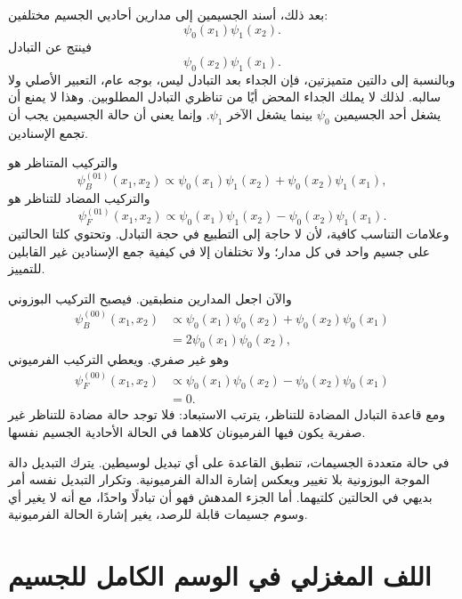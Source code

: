 بعد ذلك، أسند الجسيمين إلى مدارين أحاديي الجسيم مختلفين:
\begin{equation}
\psi_0(x_1)\psi_1(x_2).
\end{equation}
فينتج عن التبادل
\begin{equation}
\psi_0(x_2)\psi_1(x_1).
\end{equation}
وبالنسبة إلى دالتين متميزتين، فإن الجداء بعد التبادل ليس، بوجه عام، التعبير الأصلي ولا سالبه. لذلك لا يملك الجداء المحض أيًا من تناظري التبادل المطلوبين. وهذا لا يمنع أن يشغل أحد الجسيمين \(\psi_0\) بينما يشغل الآخر \(\psi_1\). وإنما يعني أن حالة الجسيمين يجب أن تجمع الإسنادين.

والتركيب المتناظر هو
\begin{equation}
\psi_B^{(01)}(x_1,x_2)
\propto
\psi_0(x_1)\psi_1(x_2)
+
\psi_0(x_2)\psi_1(x_1),
\end{equation}
والتركيب المضاد للتناظر هو
\begin{equation}
\psi_F^{(01)}(x_1,x_2)
\propto
\psi_0(x_1)\psi_1(x_2)
-
\psi_0(x_2)\psi_1(x_1).
\end{equation}
وعلامات التناسب كافية، لأن لا حاجة إلى التطبيع في حجة التبادل. وتحتوي كلتا الحالتين على جسيم واحد في كل مدار؛ ولا تختلفان إلا في كيفية جمع الإسنادين غير القابلين للتمييز.

والآن اجعل المدارين منطبقين. فيصبح التركيب البوزوني
\begin{align}
\psi_B^{(00)}(x_1,x_2)
&\propto
\psi_0(x_1)\psi_0(x_2)
+
\psi_0(x_2)\psi_0(x_1)\\
&=
2\psi_0(x_1)\psi_0(x_2),
\end{align}
وهو غير صفري. ويعطي التركيب الفرميوني
\begin{align}
\psi_F^{(00)}(x_1,x_2)
&\propto
\psi_0(x_1)\psi_0(x_2)
-
\psi_0(x_2)\psi_0(x_1)\\
&=0.
\end{align}
ومع قاعدة التبادل المضادة للتناظر، يترتب الاستبعاد: فلا توجد حالة مضادة للتناظر غير صفرية يكون فيها الفرميونان كلاهما في الحالة الأحادية الجسيم نفسها.

في حالة متعددة الجسيمات، تنطبق القاعدة على أي تبديل لوسيطين. يترك التبديل دالة الموجة البوزونية بلا تغيير ويعكس إشارة الدالة الفرميونية. وتكرار التبديل نفسه أمر بديهي في الحالتين كلتيهما. أما الجزء المدهش فهو أن تبادلًا واحدًا، مع أنه لا يغير أي وسوم جسيمات قابلة للرصد، يغير إشارة الحالة الفرميونية.

\section{اللف المغزلي في الوسم الكامل للجسيم}

